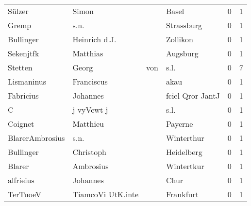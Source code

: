 \begin{tabular}{llllrr}
                   Sülzer &                              Simon &             &                                       Basel &          0 &         1 \\
                    Gremp &                               s.n. &             &                                  Strassburg &          0 &         1 \\
                Bullinger &                      Heinrich d.J. &             &                                    Zollikon &          0 &         1 \\
                Sekenjtfk &                           Matthias &             &                                    Augsburg &          0 &         1 \\
                  Stetten &                              Georg &         von &                                        s.l. &          0 &         7 \\
               Lismaninus &                         Franciscus &             &                                        akau &          0 &         1 \\
                Fabricius &                           Johannes &             &                            fciel Qror JantJ &          0 &         1 \\
                        C &                         j vyVewt j &             &                                        s.l. &          0 &         1 \\
                  Coignet &                           Matthieu &             &                                     Payerne &          0 &         1 \\
          BlarerAmbrosius &                               s.n. &             &                                  Winterthur &          0 &         1 \\
                Bullinger &                          Christoph &             &                                  Heidelberg &          0 &         1 \\
                   Blarer &                          Ambrosius &             &                                  Wintertkur &          0 &         1 \\
                alfrieius &                           Johannes &             &                                        Chur &          0 &         1 \\
                 TerTuoeV &                  TiamcoVi UtK.inte &             &                                   Frankfurt &          0 &         1 \\

\end{tabular}
